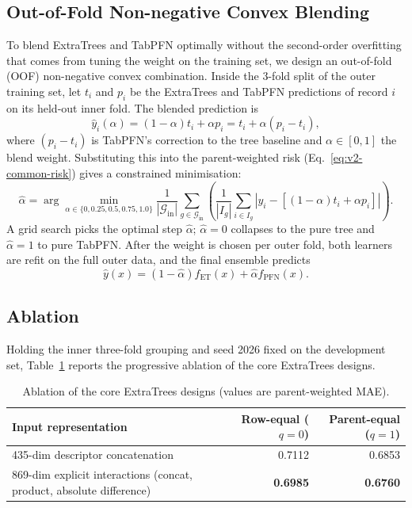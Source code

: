 \subsection{Out-of-Fold Non-negative Convex Blending}

To blend ExtraTrees and TabPFN optimally without the second-order overfitting that comes from tuning the weight on the training set, we design an out-of-fold (OOF) non-negative convex combination. Inside the 3-fold split of the outer training set, let $t_i$ and $p_i$ be the ExtraTrees and TabPFN predictions of record $i$ on its held-out inner fold. The blended prediction is
\begin{equation}
\widehat y_i(\alpha) = (1 - \alpha) t_i + \alpha p_i = t_i + \alpha (p_i - t_i),
\end{equation}
where $(p_i - t_i)$ is TabPFN's correction to the tree baseline and $\alpha \in [0, 1]$ the blend weight. Substituting this into the parent-weighted risk (Eq.~\eqref{eq:v2-common-risk}) gives a constrained minimisation:
\begin{equation}
\widehat\alpha = \arg\min_{\alpha \in \{0, 0.25, 0.5, 0.75, 1.0\}} \frac{1}{|\mathcal{G}_{\mathrm{in}}|} \sum_{g \in \mathcal{G}_{\mathrm{in}}} \left( \frac{1}{|I_g|} \sum_{i \in I_g} \left| y_i - \left[ (1 - \alpha) t_i + \alpha p_i \right] \right| \right).
\label{eq:v2-blend-selection}
\end{equation}
A grid search picks the optimal step $\widehat\alpha$; $\widehat\alpha = 0$ collapses to the pure tree and $\widehat\alpha = 1$ to pure TabPFN. After the weight is chosen per outer fold, both learners are refit on the full outer data, and the final ensemble predicts
\begin{equation}
\widehat y(x) = (1 - \widehat\alpha) f_{\mathrm{ET}}(x) + \widehat\alpha f_{\mathrm{PFN}}(x).
\label{eq:v2-prediction-blend}
\end{equation}

\subsection{Ablation}

Holding the inner three-fold grouping and seed 2026 fixed on the development set, Table~\ref{tab:v2_tree_pilot} reports the progressive ablation of the core ExtraTrees designs.

\begin{table}[htbp]
\centering
\small
\caption{Ablation of the core ExtraTrees designs (values are parent-weighted MAE).}
\label{tab:v2_tree_pilot}
\begin{tabular}{lrr}
\toprule
Input representation & Row-equal ($q=0$) & Parent-equal ($q=1$) \\
\midrule
435-dim descriptor concatenation & 0.7112 & 0.6853 \\
869-dim explicit interactions (concat, product, absolute difference) & \textbf{0.6985} & \textbf{0.6760} \\
\bottomrule
\end{tabular}
\end{table}

